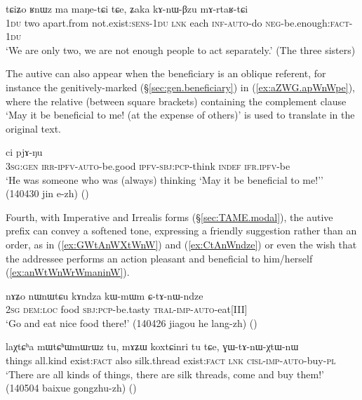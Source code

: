    \begin{exe}
\ex \label{ex:kAnWBzu.mArtaRtCi}
\gll tɕiʑo ʁnɯz ma maŋe-tɕi tɕe, ʑaka kɤ-nɯ-βzu mɤ-rtaʁ-tɕi \\
\textsc{1du} two apart.from not.exist:\textsc{sens}-\textsc{1du} \textsc{lnk} each \textsc{inf}-\textsc{auto}-do \textsc{neg}-be.enough:\textsc{fact}-\textsc{1du} \\
\glt `We are only two, we are not enough people to act separately.' (The three sisters)
\end{exe} 

The autive can also appear when the beneficiary is an oblique referent, for instance the genitively-marked  (§\ref{sec:gen.beneficiary}) in (\ref{ex:aZWG.apWnWpe}), where the relative (between square brackets) containing the complement clause  `May it be beneficial to me! (at the expense of others)' is used to translate  in the original text.

   \begin{exe}
\ex \label{ex:aZWG.apWnWpe}
 ci pjɤ-ŋu \\
\textsc{3sg}:\textsc{gen} \textsc{irr}-\textsc{ipfv}-\textsc{auto}-be.good \textsc{ipfv}-\textsc{sbj}:\textsc{pcp}-think \textsc{indef} \textsc{ifr}.\textsc{ipfv}-be   \\
\glt `He was someone who was (always) thinking `May it be beneficial to me!'' (140430 jin e-zh)
()
\end{exe} 

Fourth, with Imperative and Irrealis forms (§\ref{sec:TAME.modal}), the autive prefix can convey a softened tone, expressing a friendly suggestion rather than an order, as in   (\ref{ex:GWtAnWXtWnW}) and (\ref{ex:CtAnWndze}) or even the wish that the addressee performs an action pleasant and beneficial to him/herself (\ref{ex:anWtWnWrWmaninW}).


\begin{exe}
\ex \label{ex:CtAnWndze}
\gll nɤʑo nɯnɯtɕu kɤndza kɯ-mɯm ɕ-tɤ-nɯ-ndze  \\
\textsc{2sg} \textsc{dem}:\textsc{loc} food \textsc{sbj}:\textsc{pcp}-be.tasty \textsc{tral}-\textsc{imp}-\textsc{auto}-eat[III] \\
\glt `Go and eat nice food there!' (140426 jiagou he lang-zh)
()
\end{exe}

\begin{exe}
\ex \label{ex:GWtAnWXtWnW}
\gll laχtɕʰa mɯtɕʰɯmɯrɯz tu, mɤʑɯ koxtɕinri tu tɕe, ɣɯ-tɤ-nɯ-χtɯ-nɯ \\ 
things all.kind exist:\textsc{fact} also silk.thread exist:\textsc{fact} \textsc{lnk} \textsc{cisl}-\textsc{imp}-\textsc{auto}-buy-\textsc{pl} \\
\glt `There are all kinds of things, there are silk threads, come and buy them!' (140504 baixue gongzhu-zh) ()
\end{exe}

